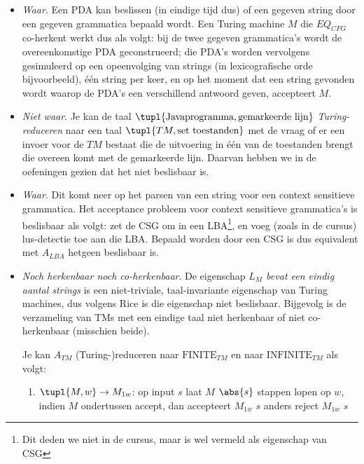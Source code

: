 \documentclass[fleqn]{article}
\begin{document}
\begin{answer}\hfill
\begin{itemize}
 \item \textit{Waar}. Een PDA kan beslissen (in eindige tijd dus) of een
gegeven string door een gegeven grammatica bepaald wordt.  Een
Turing machine $M$ die $EQ_{CFG}$ co-herkent werkt dus als volgt: bij de
twee gegeven grammatica's wordt de overeenkomstige PDA geconstrueerd;
die PDA's worden vervolgens gesimuleerd op een opeenvolging van
strings (in lexicografische orde bijvoorbeeld), \'{e}\'{e}n string per
keer, en op het moment dat een string gevonden wordt waarop de PDA's een
verschillend antwoord geven, accepteert $M$.

 \item \textit{Niet waar}. Je kan de taal $\tupl{\mbox{Javaprogramma},\mbox{gemarkeerde lijn}}$
{\em Turing-reduceren} naar een taal $\tupl{TM,\mbox{set toestanden}}$ met de vraag of
er een invoer voor de $TM$ bestaat die de uitvoering in \'e\'en van de toestanden
brengt die overeen komt met de gemarkeerde lijn. Daarvan hebben we in de oefeningen gezien dat het niet
beslisbaar is.


 \item \textit{Waar}. Dit komt neer op het parsen van een string voor
een context sensitieve grammatica. Het acceptance probleem voor
context sensitieve grammatica's is beslisbaar als volgt: zet de CSG om
in een LBA\footnote{Dit deden we niet in de cursus, maar is wel
vermeld als eigenschap van CSG}, en voeg (zoals in de cursus)
lus-detectie toe aan die LBA. Bepaald worden door een CSG is dus
equivalent met $A_{LBA}$ hetgeen beslisbaar is.


 \item \textit{Noch herkenbaar noch co-herkenbaar}. De eigenschap {\em
$L_M$ bevat een eindig aantal strings} is een niet-triviale,
taal-invariante eigenschap van Turing machines, dus volgens Rice is die
eigenschap niet beslisbaar. Bijgevolg is de verzameling van TMs met
een eindige taal niet herkenbaar of niet co-herkenbaar (misschien
beide).

Je kan $A_{TM}$ (Turing-)reduceren naar $\mbox{FINITE}_{TM}$ en naar
$\mbox{INFINITE}_{TM}$ als volgt:
\begin{enumerate}
\item $\tupl{M,w}\rightarrow M_{1w}$: op input $s$ laat $M$ $\abs{s}$ stappen lopen op $w$,
   	     	     indien $M$ ondertussen accept, dan accepteert $M_{1w}$ $s$
		     	                          anders reject $M_{1w}$ $s$


\end{enumerate}
\end{itemize}
\end{answer}
\end{document}
